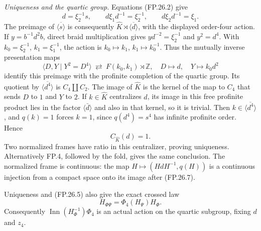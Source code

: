 \emph{Uniqueness and the quartic group.}
Equations (FP.26.2) give
\[
 d=\xi_2^{-1}s,\qquad
 d\xi_1d^{-1}=\xi_2^{-1},\qquad
 d\xi_2d^{-1}=\xi_1.
 \tag{FP.26.6}
\]
The preimage of $\overline{\langle s\rangle}$ is consequently
$\widehat K\rtimes\overline{\langle d\rangle}$, with the displayed
order-four action. If $y=b^{-1}d^2b$, direct braid multiplication gives
$yd^{-2}=\xi_2^{-1}$ and $y^2=d^4$. With
$k_0=\xi_2^{-1}$, $k_1=\xi_1^{-1}$, the action is
$k_0\mapsto k_1$, $k_1\mapsto k_0^{-1}$.
Thus the mutually inverse presentation maps
\[
 \langle D,Y\mid Y^2=D^4\rangle
 \ \rightleftarrows\ F(k_0,k_1)\rtimes\mathbb Z,
 \quad D\longmapsto d,\quad Y\longmapsto k_0d^2
\]
identify this preimage with the profinite completion of the quartic
group. Its quotient by $\overline{\langle d^4\rangle}$ is
$C_4\amalg C_2$. The image of $\widehat K$ is the kernel of the
map to $C_4$ that sends $D$ to $1$ and $Y$ to $2$.
If $k\in\widehat K$ centralizes $d$, its image in this free profinite
product lies in the factor $\langle\bar d\rangle$ and also in that
kernel, so it is trivial. Then $k\in\overline{\langle d^4\rangle}$,
and $q(k)=1$ forces $k=1$, since $q(d^4)=s^4$ has infinite
profinite order. Hence
\[
 C_{\widehat K}(d)=1.
 \tag{FP.26.7}
\]
Two normalized frames have ratio in this centralizer, proving uniqueness.
Alternatively FP.4, followed by the fold, gives the same conclusion.
The normalized frame is continuous: the map
$H\mapsto(HdH^{-1},q(H))$ is a continuous injection from a compact
space onto its image after (FP.26.7).

Uniqueness and (FP.26.5) also give the exact crossed law
\[
 H_{\Phi\Psi}=\Phi_4(H_\Psi)H_\Phi.
\]
Consequently $\operatorname{Inn}(H_\Phi^{-1})\Phi_4$ is an actual
action on the quartic subgroup, fixing $d$ and $z_4$.

